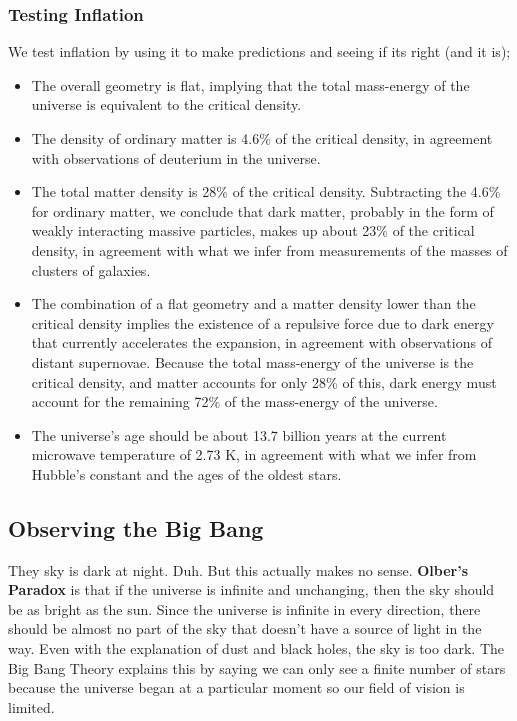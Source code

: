 \subsubsection{Testing Inflation}
We test inflation by using it to make predictions and seeing if its right (and it is);
\begin{itemize}
    \item The overall geometry is flat, implying that the total mass-energy of the universe is equivalent to the critical density.
    \item The density of ordinary matter is 4.6\% of the critical density, in agreement with observations of deuterium in the universe.
    \item The total matter density is 28\% of the critical density. Subtracting the 4.6\% for ordinary matter, we conclude that dark matter, probably in the form of weakly interacting massive particles, makes up about 23\% of the critical density, in agreement with what we infer from measurements of the masses of clusters of galaxies.
    \item The combination of a flat geometry and a matter density lower than the critical density implies the existence of a repulsive force due to dark energy that currently accelerates the expansion, in agreement with observations of distant supernovae. Because the total mass-energy of the universe is the critical density, and matter accounts for only 28\% of this, dark energy must account for the remaining 72\% of the mass-energy of the universe.
    \item The universe’s age should be about 13.7 billion years at the current microwave temperature of 2.73 K, in agreement with what we infer from Hubble’s constant and the ages of the oldest stars.
\end{itemize}

\subsection{Observing the Big Bang}
They sky is dark at night. Duh. But this actually makes no sense. \textbf{Olber's Paradox} is that if the universe is infinite and unchanging, then the sky should be as bright as the sun. Since the universe is infinite in every direction, there should be almost no part of the sky that doesn't have a source of light in the way. Even with the explanation of dust and black holes, the sky is too dark. The Big Bang Theory explains this by saying we can only see a finite number of stars because the universe began at a particular moment so our field of vision is limited.


